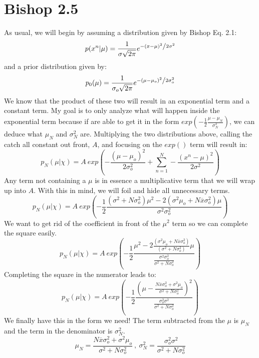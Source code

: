 \documentclass[12pt, letterpaper]{article}
\begin{document}
\section*{Bishop 2.5}
As usual, we will begin by assuming a distribution given by Bishop Eq. 2.1:
\begin{equation}
p(x^n | \mu) = \frac{1}{{\sigma \sqrt {2\pi } }}e^{{{ - \left( {x - \mu } \right)^2 } \mathord{\left/ {\vphantom {{ - \left( {x - \mu } \right)^2 } {2\sigma ^2 }}} \right. \kern-\nulldelimiterspace} {2\sigma ^2 }}}
\end{equation}
and a prior distribution given by:
\begin{equation}
p_0(\mu) = \frac{1}{{\sigma_o \sqrt {2\pi } }}e^{{{ - \left( {\mu - \mu_o } \right)^2 } \mathord{\left/ {\vphantom {{ - \left( {x - \mu } \right)^2 } {2\sigma_o ^2 }}} \right. \kern-\nulldelimiterspace} {2\sigma_o ^2 }}}
\end{equation}
We know that the product of these two will result in an exponential term and a constant term. My goal is to only analyze what will happen inside the exponential term because if are able to get it in the form $exp(-\frac{1}{2} \frac{\mu - \mu_N}{\sigma_N^2})$, we can deduce what $\mu_N$ and $\sigma_N^2$ are.
Multiplying the two distributions above, calling the catch all constant out front, $A$, and focusing on the $exp()$ term will result in:
\begin{equation}
p_N(\mu | \chi) = A \ exp(- \frac{(\mu - \mu_o)^2}{2 \sigma_o^2} + \sum_{n=1}^N - \frac{(x^n - \mu)^2}{2 \sigma^2})
\end{equation}
Any term not containing a $\mu$ is in essence a multiplicative term that we will wrap up into $A$. With this in mind, we will foil and hide all unnecessary terms. 
\begin{equation}
p_N(\mu | \chi) = A \ exp(-\frac{1}{2} \frac{(\sigma^2 + N \sigma_o^2)\mu^2 - 2 (\sigma^2 \mu_o + N \overline{x} \sigma_o^2) \mu}{\sigma^2 \sigma_o^2})
\end{equation}
We want to get rid of the coefficient in front of the $\mu^2$ term so we can complete the square easily.
\begin{equation}
p_N(\mu | \chi) = A \ exp(-\frac{1}{2} \frac{\mu^2 - 2 \frac{(\sigma^2 \mu_o + N \overline{x} \sigma_o^2)}{(\sigma^2 + N \sigma_o^2)}\mu}{\frac{\sigma^2 \sigma_o^2}{\sigma^2 + N \sigma_o^2}} )
\end{equation}
Completing the square in the numerator leads to:
\begin{equation}
p_N(\mu | \chi) = A \ exp(-\frac{1}{2} \frac{(\mu - \frac{N \overline{x} \sigma_o^2 + \sigma^2 \mu_o}{\sigma^2 + N \sigma_o^2})^2}{\frac{\sigma_o^2 \sigma^2}{\sigma^2 + N \sigma_o^2}})
\end{equation}
We finally have this in the form we need!
The term subtracted from the $\mu$ is $\mu_N$ and the term in the denominator is $\sigma_N^2$.
\begin{equation}
\mu_N = \frac{N \overline{x} \sigma_o^2 + \sigma^2 \mu_o}{\sigma^2 + N \sigma_o^2} \ , \ \sigma_N^2 = \frac{\sigma_o^2 \sigma^2}{\sigma^2 + N \sigma_o^2}
\end{equation}
\end{document}
